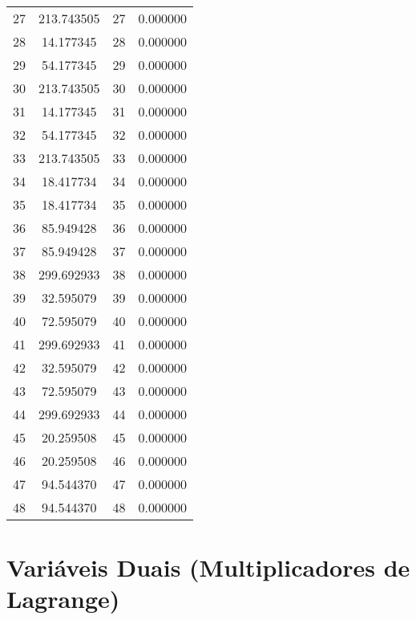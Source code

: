 \documentclass[12pt]{article}
\begin{document}
\begin{longtable}{@{}cccc@{}}
27 & 213.743505 & 27 & 0.000000 \\
28 & 14.177345 & 28 & 0.000000 \\
29 & 54.177345 & 29 & 0.000000 \\
30 & 213.743505 & 30 & 0.000000 \\
31 & 14.177345 & 31 & 0.000000 \\
32 & 54.177345 & 32 & 0.000000 \\
33 & 213.743505 & 33 & 0.000000 \\
34 & 18.417734 & 34 & 0.000000 \\
35 & 18.417734 & 35 & 0.000000 \\
36 & 85.949428 & 36 & 0.000000 \\
37 & 85.949428 & 37 & 0.000000 \\
38 & 299.692933 & 38 & 0.000000 \\
39 & 32.595079 & 39 & 0.000000 \\
40 & 72.595079 & 40 & 0.000000 \\
41 & 299.692933 & 41 & 0.000000 \\
42 & 32.595079 & 42 & 0.000000 \\
43 & 72.595079 & 43 & 0.000000 \\
44 & 299.692933 & 44 & 0.000000 \\
45 & 20.259508 & 45 & 0.000000 \\
46 & 20.259508 & 46 & 0.000000 \\
47 & 94.544370 & 47 & 0.000000 \\
48 & 94.544370 & 48 & 0.000000 \\

\end{longtable}

\section{Variáveis Duais (Multiplicadores de Lagrange)}
\end{document}
